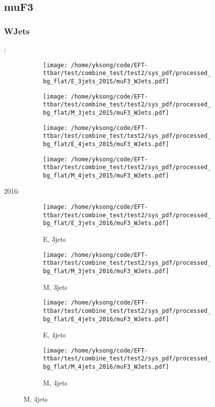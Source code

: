 \documentclass{beamer}
\begin{document}
\subsection{muF3}

\begin{frame}
\frametitle{WJets}
\fontsize{5}{1}:
\begin{figure}
\centering
\begin{subfigure}[b]{0.24\textwidth}
\texttt{[image: /home/yksong/code/EFT-ttbar/test/combine\_test/test2/sys\_pdf/processed\_bg\_flat/E\_3jets\_2015/muF3\_WJets.pdf]}
\end{subfigure}
\begin{subfigure}[b]{0.24\textwidth}
\texttt{[image: /home/yksong/code/EFT-ttbar/test/combine\_test/test2/sys\_pdf/processed\_bg\_flat/M\_3jets\_2015/muF3\_WJets.pdf]}
\end{subfigure}
\begin{subfigure}[b]{0.24\textwidth}
\texttt{[image: /home/yksong/code/EFT-ttbar/test/combine\_test/test2/sys\_pdf/processed\_bg\_flat/E\_4jets\_2015/muF3\_WJets.pdf]}
\end{subfigure}
\begin{subfigure}[b]{0.24\textwidth}
\texttt{[image: /home/yksong/code/EFT-ttbar/test/combine\_test/test2/sys\_pdf/processed\_bg\_flat/M\_4jets\_2015/muF3\_WJets.pdf]}
\end{subfigure}
\end{figure}
2016:
\begin{figure}
\centering
\begin{subfigure}[b]{0.24\textwidth}
\texttt{[image: /home/yksong/code/EFT-ttbar/test/combine\_test/test2/sys\_pdf/processed\_bg\_flat/E\_3jets\_2016/muF3\_WJets.pdf]}
\captionsetup{font=tiny}
\caption{E, 3jets}
\end{subfigure}
\begin{subfigure}[b]{0.24\textwidth}
\texttt{[image: /home/yksong/code/EFT-ttbar/test/combine\_test/test2/sys\_pdf/processed\_bg\_flat/M\_3jets\_2016/muF3\_WJets.pdf]}
\captionsetup{font=tiny}
\caption{M, 3jets}
\end{subfigure}
\begin{subfigure}[b]{0.24\textwidth}
\texttt{[image: /home/yksong/code/EFT-ttbar/test/combine\_test/test2/sys\_pdf/processed\_bg\_flat/E\_4jets\_2016/muF3\_WJets.pdf]}
\captionsetup{font=tiny}
\caption{E, 4jets}
\end{subfigure}
\begin{subfigure}[b]{0.24\textwidth}
\texttt{[image: /home/yksong/code/EFT-ttbar/test/combine\_test/test2/sys\_pdf/processed\_bg\_flat/M\_4jets\_2016/muF3\_WJets.pdf]}
\captionsetup{font=tiny}
\caption{M, 4jets}
\end{subfigure}
\end{figure}
\end{frame}
\end{document}
